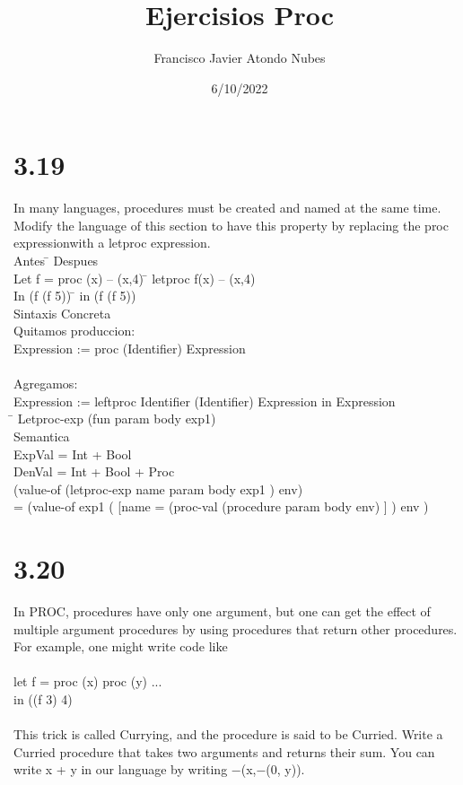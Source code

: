 \documentclass{article}
\title{Ejercisios Proc}
\author{Francisco Javier Atondo Nubes }
\date{6/10/2022}
\begin{document}
\maketitle

\begin{tab}

\section{3.19}


In many languages, procedures must be created and named at the
same time. Modify the language of this section to have this property by replacing the
proc expressionwith a letproc expression.\\


    Antes \= \> \> \> \> \> \> \> \> \> \> \> \> \> Despues\\
    Let f = proc (x) – (x,4) \= \> \> letproc f(x) – (x,4)\\
    In (f (f 5)) \= \> \> \> \> \> \> \> \> \> \> \> \> in (f (f 5))\\




Sintaxis Concreta\\
Quitamos produccion:\\
Expression := proc (Identifier) Expression\\ \\
Agregamos:\\
Expression := leftproc Identifier (Identifier) Expression in Expression\\
\= \>	Letproc-exp (fun param body exp1)\\

Semantica\\
ExpVal = Int + Bool\\
DenVal = Int + Bool + Proc\\
(value-of (letproc-exp name param body exp1 ) env)\\
= (value-of exp1 ( [name = (proc-val (procedure param body env) ] ) env )\\
\newpage
\section{3.20}

In PROC, procedures have only one argument, but one can get the effect of multiple argument procedures by using procedures that return other procedures. For example, one might write code like\\ \\
let f = proc (x) proc (y) ...\\
in ((f 3) 4)\\ \\
This trick is called Currying, and the procedure is said to be Curried. Write a Curried procedure that takes two arguments and returns their sum. You can write x + y in our language by writing −(x,−(0, y)).\\ \\


\end{tab}
\end{document}

